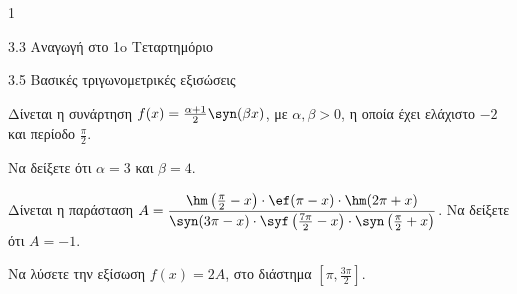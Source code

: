 \begin{ylh}{1}
\item 3.3 Αναγωγή στο 1o Τεταρτημόριο
\item 3.5 Βασικές τριγωνομετρικές εξισώσεις
\end{ylh}
Δίνεται η συνάρτηση $f(x) = \frac{\alpha+1}{2} \syn (\beta x)$, με $\alpha, \beta > 0$, η οποία έχει ελάχιστο $-2$ και περίοδο $\frac{\pi}{2}$.
\begin{alist}
\item Να δείξετε ότι $\alpha = 3$ και $\beta = 4$.
\item Δίνεται η παράσταση $A = \dfrac{\hm \left(\frac{\pi}{2} - x\right) \cdot \ef (\pi - x) \cdot \hm (2\pi + x)}{\syn (3\pi - x) \cdot \syf \left(\frac{7\pi}{2} - x\right) \cdot \syn \left(\frac{\pi}{2} + x\right)}$. Να δείξετε ότι $A = -1$.
\item Να λύσετε την εξίσωση $f(x) = 2A$, στο διάστημα $\left[\pi, \frac{3\pi}{2}\right]$.
\end{alist}

